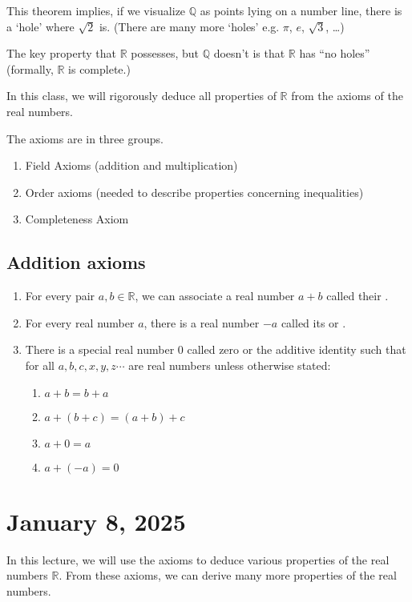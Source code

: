 \documentclass[11pt]{article}
\begin{document}
This theorem implies, if we visualize $\mathbb{Q}$ as points lying on a number
line, there is a `hole' where $\sqrt{2}$ is. (There are many more `holes' e.g.
$\pi$, $e$, $\sqrt{3}$, \ldots)

The key property that $\mathbb{R}$ possesses, but $\mathbb{Q}$ doesn't is that
$\mathbb{R}$ has ``no holes'' (formally, $\mathbb{R}$ is complete.)

In this class, we will rigorously deduce all properties of $\mathbb{R}$ from
the axioms of the real numbers.

The axioms are in three groups.

\begin{enumerate}
	\item Field Axioms (addition and multiplication)
	\item Order axioms (needed to describe properties concerning inequalities)
	\item Completeness Axiom
\end{enumerate}

\subsection{Addition axioms}
\begin{enumerate}
	\item For every pair $a, b \in \mathbb{R}$, we can associate a real number $a + b$
	      called their .
	\item For every real number $a$, there is a real number $-a$ called its
	       or .
	\item There is a special real number $0$ called zero or the additive identity such
	      that for all $a, b, c, x, y, z \cdots $ are real numbers unless otherwise
	      stated:
	      \begin{enumerate}
		      \item $a + b = b + a$
		      \item $a + (b + c) = (a + b) + c$
		      \item $a + 0 = a$
		      \item $a + (-a) = 0$
	      \end{enumerate}
\end{enumerate}

\section{January 8, 2025}
In this lecture, we will use the axioms to deduce various properties of the
real numbers $\mathbb{R}$. From these axioms, we can derive many more
properties of the real numbers.
\end{document}
